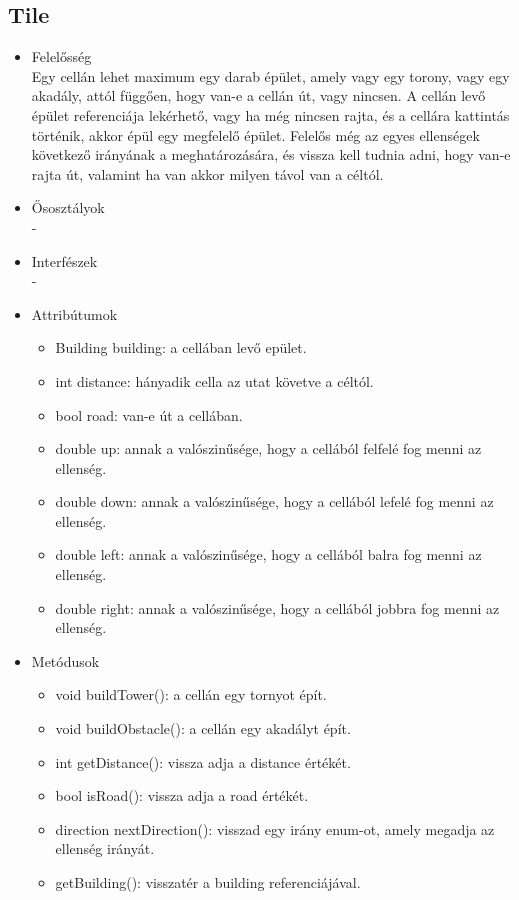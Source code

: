 \subsection{Tile}
\begin{itemize}
\item Felelősség\\
Egy cellán lehet maximum egy darab épület, amely vagy egy torony, vagy egy akadály, attól függően, hogy van-e a cellán út, vagy nincsen. A cellán levő épület referenciája lekérhető, vagy ha még nincsen rajta, és a cellára kattintás történik, akkor épül egy megfelelő épület. Felelős még az egyes ellenségek következő irányának a meghatározására, és vissza kell tudnia adni, hogy van-e rajta út, valamint ha van akkor milyen távol van a céltól.
\item Ősosztályok\\
-
\item Interfészek\\
-
\item Attribútumok\\
	\begin{itemize}
		\item Building building: a cellában levő epület.
		\item int distance: hányadik cella az utat követve a céltól.
		\item bool road: van-e út a cellában.
		\item double up: annak a valószinűsége, hogy a cellából felfelé fog menni az ellenség.
		\item double down: annak a valószinűsége, hogy a cellából lefelé fog menni az ellenség.
		\item double left: annak a valószinűsége, hogy a cellából balra fog menni az ellenség.
		\item double right: annak a valószinűsége, hogy a cellából jobbra fog menni az ellenség.
	\end{itemize}
\item Metódusok\\
	\begin{itemize}
		\item void buildTower(): a cellán egy tornyot épít.
		\item void buildObstacle(): a cellán egy akadályt épít.
		\item int getDistance(): vissza adja a distance értékét.
		\item bool isRoad(): vissza adja a road értékét.
		\item direction nextDirection(): visszad egy irány enum-ot, amely megadja az ellenség irányát.
		\item getBuilding(): visszatér a building referenciájával.
	\end{itemize}
\end{itemize}

